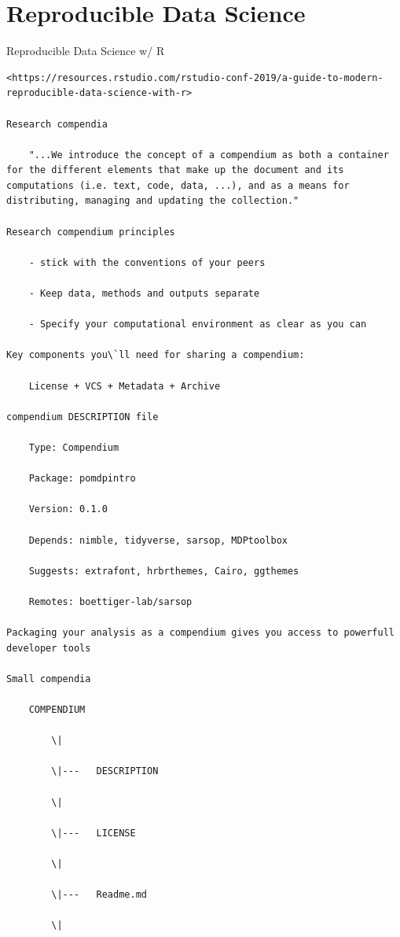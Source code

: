 \documentclass[
]{book}
\begin{document}
\hypertarget{reproducible-data-science}{%
\section{Reproducible Data Science}\label{reproducible-data-science}}

Reproducible Data Science w/ R

\begin{verbatim}
<https://resources.rstudio.com/rstudio-conf-2019/a-guide-to-modern-reproducible-data-science-with-r>

Research compendia

    "...We introduce the concept of a compendium as both a container for the different elements that make up the document and its computations (i.e. text, code, data, ...), and as a means for distributing, managing and updating the collection."

Research compendium principles

    - stick with the conventions of your peers

    - Keep data, methods and outputs separate

    - Specify your computational environment as clear as you can

Key components you\`ll need for sharing a compendium:

    License + VCS + Metadata + Archive

compendium DESCRIPTION file

    Type: Compendium

    Package: pomdpintro

    Version: 0.1.0

    Depends: nimble, tidyverse, sarsop, MDPtoolbox

    Suggests: extrafont, hrbrthemes, Cairo, ggthemes

    Remotes: boettiger-lab/sarsop

Packaging your analysis as a compendium gives you access to powerfull developer tools

Small compendia

    COMPENDIUM

        \|

        \|---   DESCRIPTION

        \|

        \|---   LICENSE

        \|

        \|---   Readme.md

        \|


\end{verbatim}
\end{document}
